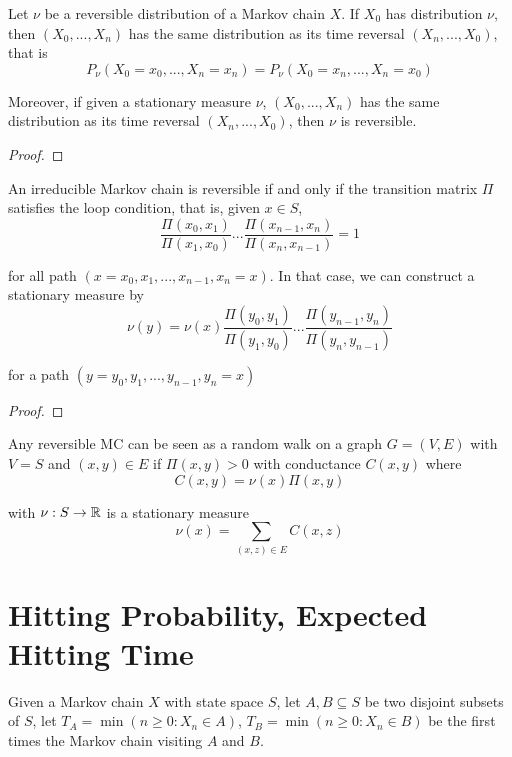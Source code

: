 \documentclass{report}
\begin{document}
\begin{proposition}
    Let $\nu$ be a reversible distribution of a Markov chain $X$. If $X_0$ has distribution $\nu$, then $(X_0, ..., X_n)$ has the same distribution as its time reversal $(X_n, ..., X_0)$, that is
    $$
        P_\nu(X_0=x_0, ..., X_n = x_n) = P_\nu(X_0=x_n, ..., X_n = x_0)
    $$

    Moreover, if given a stationary measure $\nu$, $(X_0, ..., X_n)$ has the same distribution as its time reversal $(X_n, ..., X_0)$, then $\nu$ is reversible.
\begin{proof}
\end{proof}
\end{proposition}

\begin{theorem}
    An irreducible Markov chain is reversible if and only if the transition matrix $\Pi$ satisfies the loop condition, that is, given $x \in S$,
    $$
        \frac{\Pi(x_0, x_1)}{\Pi(x_1, x_0)} ... \frac{\Pi(x_{n-1}, x_n)}{\Pi(x_n, x_{n-1})} = 1
    $$

    for all path $(x = x_0, x_1, ..., x_{n-1}, x_n = x)$. In that case, we can construct a stationary measure by
    $$
        \nu(y) = \nu(x) \frac{\Pi(y_0, y_1)}{\Pi(y_1, y_0)} ... \frac{\Pi(y_{n-1}, y_n)}{\Pi(y_n, y_{n-1})}
    $$

    for a path $(y = y_0, y_1, ..., y_{n-1}, y_n = x)$
\begin{proof}
\end{proof}
\end{theorem}

\begin{remark}
	Any reversible MC can be seen as a random walk on a graph $G = (V, E)$ with $V = S$ and $(x, y) \in E$ if $\Pi(x, y) > 0$ with conductance $C(x, y)$ where
	$$
		C(x, y) = \nu(x) \Pi(x, y)
	$$
	
	with $\nu: S \to \mathbb{R}$ is a stationary measure
	$$
		\nu(x) = \sum_{(x, z) \in E} C(x, z)
	$$
\end{remark}

\section{Hitting Probability, Expected Hitting Time}

Given a Markov chain $X$ with state space $S$, let $A, B \subseteq S$ be two disjoint subsets of $S$, let $T_A = \min(n \geq 0: X_n \in A)$, $T_B = \min(n \geq 0: X_n \in B)$ be the first times the Markov chain visiting $A$ and $B$.
\end{document}
